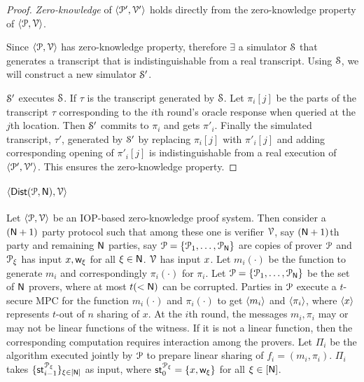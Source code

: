 \begin{proof}
	\textit{Zero-knowledge} of $\langle \mathcal{P}', \mathcal{V}' \rangle$ holds directly from the zero-knowledge property of $\langle \mathcal{P}, \mathcal{V} \rangle$. 
	
	Since $\langle \mathcal{P}, \mathcal{V} \rangle$ has zero-knowledge property, therefore $\exists$ a simulator $\mathcal{S}$ that generates a transcript that is indistinguishable from a real transcript. 
	Using $\mathcal{S}$, we will construct a new simulator $\mathcal{S}'$. 
	
	$\mathcal{S}'$ executes $\mathcal{S}$. If $\tau$ is the transcript generated by $\mathcal{S}$. Let $\pi_i[j]$ be the parts of the transcript $\tau$ corresponding to the $i$th round's oracle response when queried at the $j$th location. Then $\mathcal{S}'$ commits to $\pi_i$ and gets $\pi'_i$. Finally the simulated transcript, $\tau'$, generated by $\mathcal{S}'$ by replacing $\pi_i[j]$ with $\pi'_i[j]$ and adding corresponding opening of $\pi'_i[j]$ is indistinguishable from a real execution of $\langle \mathcal{P}', \mathcal{V}' \rangle$. This ensures the zero-knowledge property.
\end{proof}

\paragraph*{$\langle \mathsf{Dist}(\mathcal{P}, \mathsf{N}),\mathcal{V}\rangle$} 
Let $\langle \mathcal{P},\mathcal{V}\rangle$ be an IOP-based zero-knowledge proof system. Then consider a $(\mathsf{N} + 1)$ party protocol such that among these one is verifier $\mathcal{V}$, say $(\mathsf{N} + 1)$th party and remaining $\mathsf{N}$ parties, say $\mathcal{P} = \{ \mathcal{P}_1, \ldots, \mathcal{P}_{\mathsf{N}}\}$ are copies of prover $\mathcal{P}$ and $\mathcal{P}_\xi$ has input ${x}, \mathsf{w}_\xi$ for all $\xi \in \mathsf{N}$. $\mathcal{V}$ has input ${x}$.
Let $m_i(\cdot)$ be the function to generate $m_i$ and correspondingly $\pi_i(\cdot)$ for $\pi_i$. Let $\mathcal{P} = \{\mathcal{P}_{1}, \ldots, \mathcal{P}_{\mathsf{N}}\}$ be the set of $\mathsf{N}$ provers, where at most $t (<\mathsf{N})$ can be corrupted. Parties in $\mathcal{P}$ execute a $t$-secure MPC for the function $m_i(\cdot)$ and $\pi_i(\cdot)$ to get $\langle m_i \rangle$ and $\langle \pi_i \rangle$, where $\langle x \rangle$ represents $t$-out of $n$ sharing of $x$. At the $i$th round, the messages $m_i,\pi_i$ may or may not be linear functions of the witness. If it is not a linear function, then the corresponding computation requires interaction among the provers. Let $\Pi_i$ be the algorithm executed jointly by $\mathcal{P}$ to prepare linear sharing of $f_i = (m_i, \pi_i)$. $\Pi_i$ takes $\{\mathsf{st}^{\mathcal{P}_\xi}_{i-1}\}_{\xi \in [\mathsf{N}]}$ as input, where $\mathsf{st}^{\mathcal{P}_\xi}_{0} = \{{x}, \mathsf{w}_{\xi}\}$ for all $\xi \in [\mathsf{N}]$.

